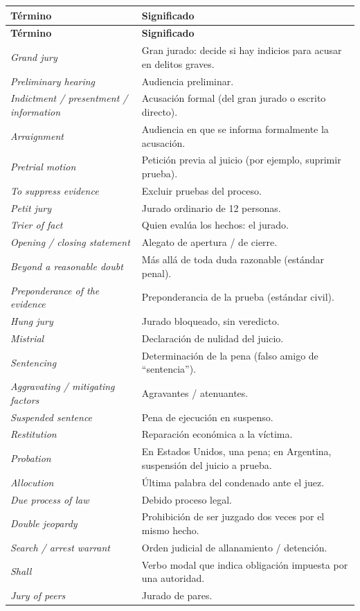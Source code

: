 \documentclass[12pt,oneside]{book}
\begin{document}
\begin{longtable}{@{}>{\raggedright\arraybackslash}p{}>{\raggedright\arraybackslash}p{}@{}}
\toprule
\textbf{Término} & \textbf{Significado} \\
\midrule
\endfirsthead
\toprule
\textbf{Término} & \textbf{Significado} \\
\midrule
\endhead
\bottomrule
\endlastfoot

\textit{Grand jury} & Gran jurado: decide si hay indicios para acusar en delitos graves. \\
\textit{Preliminary hearing} & Audiencia preliminar. \\
\textit{Indictment / presentment / information} & Acusación formal (del gran jurado o escrito directo). \\
\textit{Arraignment} & Audiencia en que se informa formalmente la acusación. \\
\textit{Pretrial motion} & Petición previa al juicio (por ejemplo, suprimir prueba). \\
\textit{To suppress evidence} & Excluir pruebas del proceso. \\
\textit{Petit jury} & Jurado ordinario de 12 personas. \\
\textit{Trier of fact} & Quien evalúa los hechos: el jurado. \\
\textit{Opening / closing statement} & Alegato de apertura / de cierre. \\
\textit{Beyond a reasonable doubt} & Más allá de toda duda razonable (estándar penal). \\
\textit{Preponderance of the evidence} & Preponderancia de la prueba (estándar civil). \\
\textit{Hung jury} & Jurado bloqueado, sin veredicto. \\
\textit{Mistrial} & Declaración de nulidad del juicio. \\
\textit{Sentencing} & Determinación de la pena (falso amigo de ``sentencia''). \\
\textit{Aggravating / mitigating factors} & Agravantes / atenuantes. \\
\textit{Suspended sentence} & Pena de ejecución en suspenso. \\
\textit{Restitution} & Reparación económica a la víctima. \\
\textit{Probation} & En Estados Unidos, una pena; en Argentina, suspensión del juicio a prueba. \\
\textit{Allocution} & Última palabra del condenado ante el juez. \\
\textit{Due process of law} & Debido proceso legal. \\
\textit{Double jeopardy} & Prohibición de ser juzgado dos veces por el mismo hecho. \\
\textit{Search / arrest warrant} & Orden judicial de allanamiento / detención. \\
\textit{Shall} & Verbo modal que indica obligación impuesta por una autoridad. \\
\textit{Jury of peers} & Jurado de pares. \\
\end{longtable}
\end{document}
